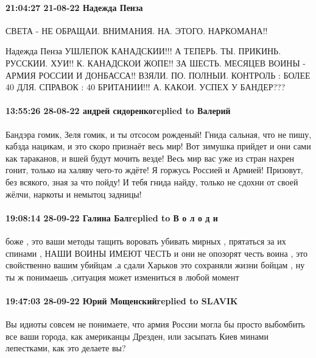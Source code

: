 \paragraph{21:04:27 21-08-22 Надежда Пенза}

СВЕТА - НЕ ОБРАЩАИ. ВНИМАНИЯ. НА. ЭТОГО. НАРКОМАНА!!

Надежда Пенза
УШЛЕПОК КАНАДСКИИ!!!
А ТЕПЕРЬ. ТЫ. ПРИКИНЬ. РУССКИИ. ХУИ!!
К. КАНАДСКОИ ЖОПЕ!!
ЗА ШЕСТЬ. МЕСЯЦЕВ ВОИНЫ -
АРМИЯ РОССИИ И ДОНБАССА!!
ВЗЯЛИ. ПО. ПОЛНЫИ. КОНТРОЛЬ :
БОЛЕЕ 40 %
ДЛЯ. СПРАВОК :
40 %
БРИТАНИИ!!!
А. КАКОИ. УСПЕХ У БАНДЕР???

\paragraph{13:55:26 28-08-22 андрей сидоренкоreplied to Валерий}

Бандэра гомик, Зеля гомик, и ты отсосом рожденый! Гнида сальная, что не пишу,
кабзда нацикам, и это скоро признаёт весь мир! Вот зимушка прийдет и они сами
как тараканов, и вшей будут мочить везде! Весь мир вас уже из стран нахрен
гонит, только на халяву чего-то ждёте! Я горжусь Россией и Армией! Призовут,
без всякого, зная за что пойду! И тебя гнида найду, только не сдохни от своей
жёлчи, наркоты и немытоц задницы!


\paragraph{19:08:14 28-09-22 Галина Балreplied to В о л о д и}

боже , это ваши методы тащить воровать убивать мирных , прятаться за их спинами
, НАШИ ВОИНЫ ИМЕЮТ ЧЕСТЬ и они не опозорят честь воина , это свойственно вашим
убийцам .а сдали Харьков это сохраняли жизни бойцам , ну ты ж понимаешь
,ситуация может измениться в любой момент

\paragraph{19:47:03 28-09-22 Юрий Мощенскийreplied to SLAVIK}

Вы идиоты совсем не понимаете, что армия России могла бы просто выбомбить все
ваши города, как американцы Дрезден, или засыпать Киев минами лепестками, как
это делаете вы?

